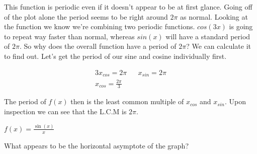 \documentclass[10pt,letterpaper]{amspset}
\begin{document}
\begin{solution}
    
    This function is periodic even if it doesn't appear to be at first glance. Going off of the plot alone the period seems to be right around $2\pi$ as normal. Looking at the function we know we're combining two periodic functions. $cos(3x)$ is going to repeat way faster than normal, whereas $sin(x)$ will have a standard period of $2\pi$. So why does the overall function have a period of $2\pi$? We can calculate it to find out. Let's get the period of our sine and cosine individually first.
    
    \begin{align}
        3x_{cos} = 2\pi && x_{sin} = 2\pi \\
        x_{cos} = \frac{2\pi}{3}
    \end{align}
    
    The period of $f(x)$ then is the least common multiple of $x_{cos}$ and $x_{sin}$. Upon inspection we can see that the L.C.M is $2\pi$. 
\end{solution}


\pagebreak


\begin{problem}[45]
    $f(x) = \frac{\sin(x)}{x}$
    
    What appears to be the horizontal asymptote of the graph?
\end{problem}
\end{document}

